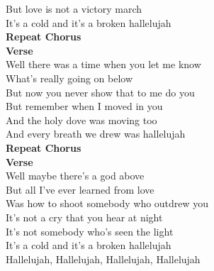 But love is not a victory march\\
It's a cold and it's a broken hallelujah\\
\textbf{Repeat Chorus}\\
\textbf{Verse}\\
Well there was a time when you let me know \\
What's really going on below\\
But now you never show that to me do you \\
But remember when I moved in you\\
And the holy dove was moving too\\
And every breath we drew was hallelujah\\
\textbf{Repeat Chorus}\\
\textbf{Verse}\\
Well maybe there's a god above \\
But all I've ever learned from love\\
Was how to shoot somebody who outdrew you \\
It's not a cry that you hear at night\\
It's not somebody who's seen the light\\
It's a cold and it's a broken hallelujah\\
Hallelujah, Hallelujah, Hallelujah, Hallelujah \\
